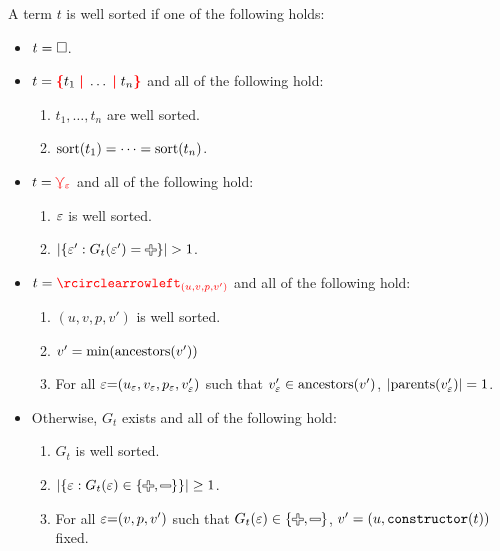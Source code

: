 \begin{definition}
  A term $t$ is well sorted if one of the following holds:
  \begin{itemize}
    \item $t = \square$.
    \item $t = \conflictHole{t_1, \ldots, t_n}$ and all of the following hold:
      \begin{enumerate}
        \item $t_1, \ldots, t_n$ are well sorted.
        \item $\operatorname{\text{sort}}\mathopen{}\left(t_1\right)\mathclose{} = \cdots = \operatorname{\text{sort}}\mathopen{}\left(t_n\right)\mathclose{}$.
      \end{enumerate}
    \item $t = \textcolor{red}{\curlyveedownarrow_{\varepsilon}}$ and all of the following hold:
      \begin{enumerate}
        \item $\varepsilon$ is well sorted.
        \item $\SizeOf{\SetOf{\e' \SuchThat{G_t(\e') = \Plus}}} > 1$.
      \end{enumerate}
    \item $t = \cycleVertex{(u, v, p, v')}$ and all of the following hold:
      \begin{enumerate}
        \item $(u, v, p, v')$ is well sorted.
        \item $v' = \operatorname{\text{min}}\mathopen{}\left(\operatorname{\text{ancestors}}\mathopen{}\left(v'\right)\mathclose{}\right)\mathclose{}$
        \item For all $\varepsilon{=}(u_{\varepsilon}, v_{\varepsilon}, p_{\varepsilon}, v_{\varepsilon}')$
          such that $v_{\varepsilon}' \in \operatorname{\text{ancestors}}\mathopen{}\left(v'\right)\mathclose{}$,
          $\left\lvert\operatorname{\text{parents}}\mathopen{}\left(v_{\varepsilon}'\right)\mathclose{}\right\rvert = 1$.
      \end{enumerate}
    \item Otherwise, $G_t$ exists and all of the following hold:
      \begin{enumerate}
        \item $G_t$ is well sorted.
        \item $\SizeOf{\SetOf{\e \SuchThat{G_t(\e) \in \SetOf{\Plus, \Minus}}}} \geq 1$.
        \item For all $\varepsilon{=}(v, p, v')$ such that $G_t(\e) \in \SetOf{\Plus, \Minus}$,
          $v' = (u, \operatorname{\texttt{constructor}}\mathopen{}\left(t\right)\mathclose{})$ fixed.
      \end{enumerate}
  \end{itemize}
\end{definition}

